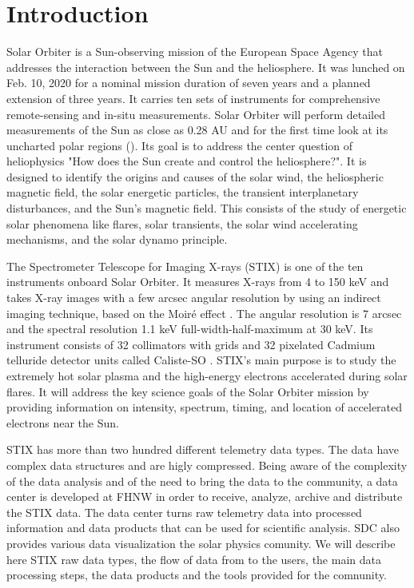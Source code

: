 \documentclass{aa}
\begin{document}
   \maketitle
%

\section{Introduction}
Solar Orbiter is a Sun-observing mission of the European Space  Agency that 
addresses the interaction between the Sun and the heliosphere.
It was lunched on Feb. 10, 2020 for a nominal mission duration of seven years and a planned 
extension of
three years. It carries ten sets of instruments for comprehensive
remote-sensing and in-situ measurements. 
Solar Orbiter  will perform detailed measurements of the Sun as close as 0.28 AU and for the first time look at its uncharted polar regions (\cite{SolarOrbiter2020}).  
Its goal is to  address the center question of heliophysics  "How does the Sun create and control the heliosphere?".  It is designed to identify the origins and causes of the solar wind, the heliospheric magnetic field, the solar energetic particles, the transient interplanetary disturbances, and the Sun's magnetic field.
This consists of the study of energetic solar phenomena like flares,  solar transients,  the solar wind accelerating mechanisms, and the solar dynamo principle.  


The Spectrometer Telescope for Imaging X-rays (STIX) is one of the ten instruments onboard Solar Orbiter.  It measures X-rays from 4 to 150 keV and takes X-ray images with a few arcsec angular resolution by using an indirect imaging technique, based on the Moiré effect .  The angular resolution
is 7 arcsec and the spectral resolution 1.1 keV full-width-half-maximum at 30 keV.
Its instrument consists of 32 collimators with
grids and 32 pixelated Cadmium telluride  detector units called Caliste-SO  \cite{StixInstrument}.
STIX's main purpose is to study the extremely hot solar plasma and the high-energy electrons accelerated during solar flares.
It will address the key science goals of the Solar Orbiter mission by providing information on intensity, spectrum, timing, and location of accelerated electrons near the Sun. 


STIX has more than two hundred different telemetry data types. The data
have complex data structures and are higly compressed.
Being aware of the complexity of the data analysis and of
the need to bring the data to the community, a data center is
developed at FHNW in order to receive, analyze,  archive and distribute the STIX data.
The data center turns raw telemetry data into processed information and data products that can be used for scientific analysis.
SDC also provides various data visualization the solar physics comunity.
We will describe here STIX raw data types, the flow of data from to the users, the main data processing steps, the data products and the tools provided for the comnunity.
\end{document}
